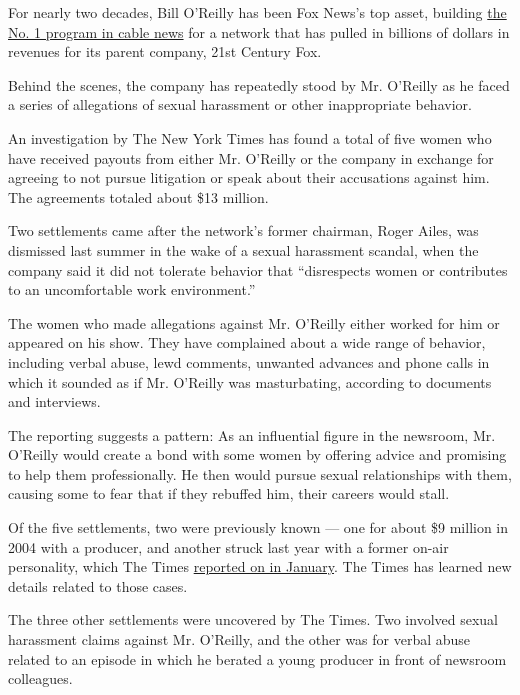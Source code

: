For nearly two decades, Bill O'Reilly has been Fox News's top asset,
building
\href{http://www.adweek.com/tvnewser/the-top-cable-news-programs-of-2016-were/315007}{the
No. 1 program in cable news} for a network that has pulled in billions
of dollars in revenues for its parent company, 21st Century Fox.

Behind the scenes, the company has repeatedly stood by Mr. O'Reilly as
he faced a series of allegations of sexual harassment or other
inappropriate behavior.

An investigation by The New York Times has found a total of five women
who have received payouts from either Mr. O'Reilly or the company in
exchange for agreeing to not pursue litigation or speak about their
accusations against him. The agreements totaled about \$13 million.

Two settlements came after the network's former chairman, Roger Ailes,
was dismissed last summer in the wake of a sexual harassment scandal,
when the company said it did not tolerate behavior that ``disrespects
women or contributes to an uncomfortable work environment.''

The women who made allegations against Mr. O'Reilly either worked for
him or appeared on his show. They have complained about a wide range of
behavior, including verbal abuse, lewd comments, unwanted advances and
phone calls in which it sounded as if Mr. O'Reilly was masturbating,
according to documents and interviews.

The reporting suggests a pattern: As an influential figure in the
newsroom, Mr. O'Reilly would create a bond with some women by offering
advice and promising to help them professionally. He then would pursue
sexual relationships with them, causing some to fear that if they
rebuffed him, their careers would stall.

Of the five settlements, two were previously known --- one for about \$9
million in 2004 with a producer, and another struck last year with a
former on-air personality, which The Times
\href{https://www.nytimes3xbfgragh.onion/2017/01/10/business/media/bill-oreilly-sexual-harassment-fox-news-juliet-huddy.html}{reported
on in January}. The Times has learned new details related to those
cases.

The three other settlements were uncovered by The Times. Two involved
sexual harassment claims against Mr. O'Reilly, and the other was for
verbal abuse related to an episode in which he berated a young producer
in front of newsroom colleagues.

